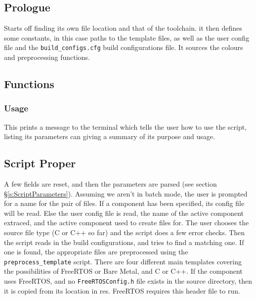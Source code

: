 \documentclass[a4paper, oneside, 11pt, titlepage, onecolumn, openright]{report}
\begin{document}
\subsection{Prologue}
			\label{ss:crefilePrologue}
			Starts off finding its own file location and that of the toolchain. it then defines some constants, in this case paths to the template files, as well as the user config file and the \texttt{build\_configs.cfg} build configurations file. It sources the colours and preprocessing functions.
			
\subsection{Functions}
			\label{ss:crefileFunctions}
			
\subsubsection{Usage}
			\label{sss:crefileUsage}
			This prints a message to the terminal which tells the user how to use the script, listing its parameters can giving a summary of its purpose and usage.
			
\subsection{Script Proper}
			\label{ss:crefileScriptProper}
			A few fields are reset, and then the parameters are parsed (see section \S\ref{s:ScriptParameters}). \newline
			Assuming we aren't in batch mode, the user is prompted for a name for the pair of files. If a component has been specified, its config file will be read.\newline
			Else the user config file is read, the name of the active component extraced, and the active component used to create files for.\newline
			The user chooses the source file type (C or C++ so far) and the script does a few error checks.\newline
			Then the script reads in the build configurations, and tries to find a matching one. If one is found, the appropriate files are preprocessed using the \texttt{preprocess\_template} script. There are four different main templates covering the possibilities of FreeRTOS or Bare Metal, and C or C++.\newline
			If the component uses FreeRTOS, and no \texttt{FreeRTOSConfig.h} file exists in the source directory, then it is copied from its location in res. FreeRTOS requires this header file to run.
			
\end{document}

